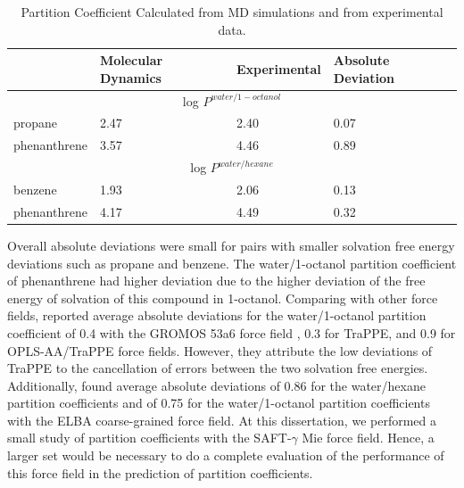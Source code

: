 \begin{table}[H]
    \centering
    \caption{Partition Coefficient Calculated from MD simulations and from experimental data.}
    \label{tbl:part}
    \begin{tabular}{llll}
    	\hline\hline
    	             & {Molecular Dynamics} & {Experimental} & Absolute Deviation \\ \hline
    	              \multicolumn{4}{c}{log $P^{water/1-octanol}$}               \\ \hline
    	propane      & 2.47                 & 2.40           & 0.07               \\
    	phenanthrene & 3.57                 & 4.46           & 0.89               \\ \hline
    	               \multicolumn{4}{c}{log $P^{water/hexane}$}                 \\ \hline
    	benzene      & 1.93                 & 2.06           & 0.13               \\
    	phenanthrene & 4.17                 & 4.49           & 0.32               \\
\hline\hline
    \end{tabular}
    
\end{table}

Overall absolute deviations were small for pairs with smaller solvation free energy deviations such as propane and benzene. The water/1-octanol partition coefficient of phenanthrene had higher deviation due to the higher deviation of the free energy of solvation of this compound in 1-octanol. Comparing with other force fields,  reported average absolute deviations for the water/1-octanol partition coefficient of 0.4 with the GROMOS 53a6 force field \cite{JCC:JCC20090}, 0.3 for TraPPE, and 0.9 for OPLS-AA/TraPPE force fields. However, they attribute the low deviations of TraPPE to the cancellation of errors between the two solvation free energies. Additionally,  found average absolute deviations of 0.86 for the water/hexane partition coefficients and of 0.75 for the water/1-octanol partition coefficients with the ELBA coarse-grained force field. At this dissertation, we performed a small study of partition coefficients with the SAFT-$\gamma$ Mie force field. Hence, a larger set would be necessary to do a complete evaluation of the performance of this force field in the prediction of partition coefficients. 